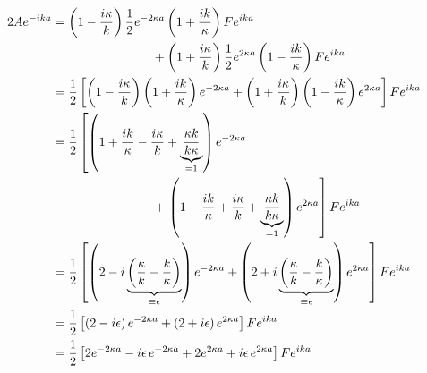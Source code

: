 {\allowdisplaybreaks
\begin{align}
   2Ae^{-ika} & = \left(1-\frac{i\kappa}{k}\right)
                   \frac{1}{2}e^{-2\kappa a}
                   \left(1+\frac{ik}{\kappa}\right)Fe^{ika}\notag \\
                 &\qquad \qquad \qquad \qquad
                 +\left(1+\frac{i\kappa}{k}\right)
                    \frac{1}{2}e^{2\kappa a}
                   \left(1-\frac{ik}{\kappa}\right)Fe^{ika} \notag \\
              & = \frac{1}{2}\left[\left(1-\frac{i\kappa}{k}\right)
                     \left(1+\frac{ik}{\kappa}\right)
                     e^{-2\kappa a}
                     +\left(1+\frac{i\kappa}{k}\right)
                     \left(1-\frac{ik}{\kappa}\right)
                     e^{2\kappa a}\right]
                     Fe^{ika} \notag \\
                &= \frac{1}{2}\left[
                     \left(1+\frac{ik}{\kappa}
                             -\frac{i\kappa}{k}
                             +\underbrace{\frac{\kappa k}{k \kappa}}_{=1}\right)
                     e^{-2\kappa a}\right.\notag\\
                     &\qquad \qquad \qquad \qquad
                     +\left.\left(1-\frac{ik}{\kappa}
                     +\frac{i\kappa}{k}
                     +\underbrace{\frac{\kappa k}{k \kappa}}_{=1}\right)
                     e^{2\kappa a}\right]
                     Fe^{ika} 
                   \notag \\
              & = \frac{1}{2}\left[
                     \left(2-i\underbrace{\left(\frac{\kappa}{k}
                             -\frac{k}{\kappa}\right)}_{\equiv\epsilon}\right)
                     e^{-2\kappa a}
                     +\left(2+i\underbrace{\left(\frac{\kappa}{k}
                             -\frac{k}{\kappa}\right)}_{\equiv\epsilon}\right)
                     e^{2\kappa a}\right]
                     Fe^{ika} \notag \\
              & = \frac{1}{2}\left[
                     \left(2-i\epsilon\right)
                     e^{-2\kappa a}
                     +\left(2+i\epsilon\right)
                     e^{2\kappa a}\right]
                     Fe^{ika} \notag \\
              & = \frac{1}{2}\left[
                     2 e^{-2\kappa a}-i\epsilon \, e^{-2\kappa a}
                     +2 e^{2\kappa a}+i\epsilon \, e^{2\kappa a}\right]
                     Fe^{ika} \notag \\

\end{align}}
